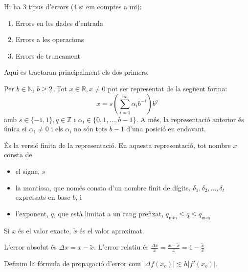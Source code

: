 \documentclass[../main.tex]{subfiles}
\begin{document}
    Hi ha 3 tipus d'errors (4 si em comptes a mi):
    \begin{enumerate}
        \item Errors en les dades d'entrada
        \item Errors a les operacions
        \item Errors de truncament
    \end{enumerate}
    Aquí es tractaran principalment els dos primers.
    \begin{teorema}
        Per $b \in \mathbb{N}$, $b \geq 2$. Tot $x \in \mathbb{R}, x\neq 0$ pot ser representat de
        la següent forma:
        \begin{displaymath}
            x = s(\sum\limits_{i=1}^{\infty}\alpha_ib^{-i}) b^q
        \end{displaymath}
        amb $s \in \{-1, 1\}, q \in \mathbb{Z}$ i $\alpha_i \in \{0, 1, \dots, b-1\}$. A més, la
        representació anterior és única si $\alpha_1 \neq 0$ i els $\alpha_i$ no són tots $b-1$ 
        d'una posició en endavant.
    \end{teorema}
    \begin{definicio}
        És la versió finita de la representació. En aquesta representació, tot nombre $x$ consta de 
        \begin{itemize}
            \item el signe, $s$
            \item la mantissa, que només consta d'un nombre finit de dígits, $\delta_1, \delta_2, \dots, \delta_t$
            expressats en base $b$, i
            \item l'exponent, $q$, que està limitat a un rang prefixat, $q_\text{min} \leq q \leq q_\text{max}$
        \end{itemize}
    \end{definicio}
    \begin{notacio}
        Si $x$ és el valor exacte, $\tilde{x}$ és el valor aproximat.
    \end{notacio}
    \begin{definicio}
        L'error absolut és $\Delta x = x - \tilde{x}$. L'error relatiu és $\frac{\Delta x}{x} = \frac{x-\tilde{x}}{x} = 1 - \frac{\tilde{x}}{x}$
    \end{definicio}
    \begin{definicio}
        Definim la fórmula de propagació d'error com $|\Delta f(x_o)| \lesssim h|f'(x_o)|$.
    \end{definicio}
\end{document}
